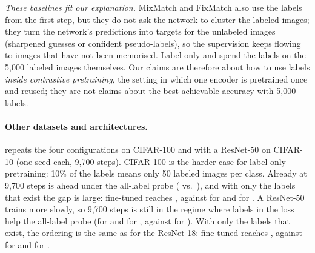\emph{These baselines fit our explanation.} MixMatch and FixMatch also use the labels from the first step, but
they do not ask the network to cluster the labeled images; they turn the network's predictions into targets for
the unlabeled images (sharpened guesses or confident pseudo-labels), so the supervision keeps flowing to images
that have not been memorised. Label-only \supcon and
\union spend the labels on the 5,000 labeled images themselves. Our claims are therefore about how to use labels
\emph{inside contrastive pretraining}, the setting in which one encoder is pretrained once and reused; they are
not claims about the best achievable accuracy with 5,000 labels.

\paragraph{Other datasets and architectures.}
 repeats the four configurations on CIFAR-100 and with a ResNet-50 on CIFAR-10 (one
seed each, 9,700 steps). CIFAR-100 is the harder case for label-only pretraining: 10\% of the labels means only
50 labeled images per class. Already at 9,700 steps \simclr is ahead under the all-label probe (\cHundredSimclr
vs.\ \cHundredSupcon), and with only the labels that exist the gap is large: fine-tuned \simclr reaches
\cHundredSimclrFt, against \cHundredSupconFt for \supcon and \cHundredUnionFt for \union. A ResNet-50 trains more slowly,
so 9,700 steps is still in the regime where labels in the loss help the all-label probe (\rFiftySupcon for
\supcon and \rFiftyUnion for \union, against \rFiftySimclr for \simclr). With only the labels that exist, the
ordering is the same as for the ResNet-18: fine-tuned \simclr reaches \rFiftySimclrFt, against \rFiftySupconFt for
\supcon and \rFiftyUnionFt for \union.

\begin{table}[t]
\centering
\small
\caption{The four configurations on CIFAR-100 (ResNet-18) and with a ResNet-50 on CIFAR-10 (one seed,
10\% labels, 9,700 steps). ``Probe, 50k'' and $k$NN use all training labels; ``fine-tune, 5k'' and ``probe, 5k''
use only the labeled 10\%.}
\label{tab:generalization}

\end{table}
